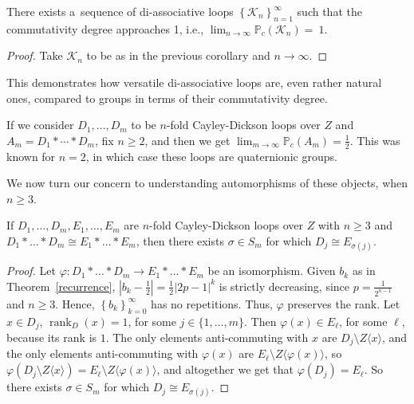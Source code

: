 \documentclass{jonasart}
\begin{document}
	\begin{corollary}
		There exists a~sequence of di-associative loops $\left\{\mathcal{K}_n\right\}_{n=1}^{\infty}$ such that the commutativity degree approaches 1, i.e., $\lim_{n\rightarrow \infty}\mathbb{P}_c (\mathcal{K}_n )=~1$.
	\end{corollary}

	\begin{proof}
		Take $\mathcal{K}_n$ to be as in the previous corollary and $n \rightarrow \infty$.
	\end{proof}

	This demonstrates how versatile di-associative loops are, even rather natural ones, compared to groups in terms of their commutativity degree.

	\begin{remark}
		If we consider $D_1,\dots,D_m$ to be $n$-fold Cayley-Dickson loops over $Z$ and $A_m = D_1 \ast \cdots \ast D_m$, fix $n \geqslant 2$, and then we get $\lim_{m\rightarrow \infty}\mathbb{P}_c (A_m ) = \frac{1}{2}$. This was known for $n=2$, in which case these loops are quaternionic groups.
	\end{remark}

	We now turn our concern to understanding automorphisms of these objects, when $n \geqslant 3$.

	\begin{theorem}
		If $D_1,\dots,D_m,E_1,\dots,E_m$ are $n$-fold Cayley-Dickson loops over $Z$ with $n \geqslant 3$ and $D_1 \ast \dots \ast D_m \cong E_1 \ast \dots \ast E_m$, then there exists $\sigma \in S_m$ for which $D_j \cong E_{\sigma(j)}$.
	\end{theorem}

	\begin{proof}
		Let $\varphi: D_1 \ast \dots \ast D_m \rightarrow E_1 \ast \dots \ast E_m$ be an isomorphism. Given $b_k$ as in Theorem~\ref{recurrence}, $|b_k -\frac{1}{2}| = \frac{1}{2}|2p-1|^{k}$ is strictly decreasing, since $p = \frac{1}{2^{n-1}}$ and $n \geqslant 3$. Hence, $\left\{b_k\right\}_{k=0}^{\infty}$ has no repetitions. Thus, $\varphi$ preserves the rank. Let $x \in D_j$, $\operatorname{rank}_D (x)=1$, for some $j \in \{1,\dots, m\}$. Then $\varphi(x) \in E_\ell$, for some $\ell$, because its rank is $1$. The only elements anti-commuting with $x$ are $D_j\setminus Z\langle x \rangle$, and the only elements anti-commuting with $\varphi(x)$ are $E_\ell \setminus Z\langle \varphi(x) \rangle$, so $\varphi(D_j\setminus Z\langle x \rangle) = E_\ell \setminus Z\langle \varphi(x) \rangle$, and altogether we get that $\varphi(D_j )=E_\ell$. So there exists $\sigma \in S_m$ for which $D_j \cong E_{\sigma(j)}$.
	\end{proof}
\end{document}
